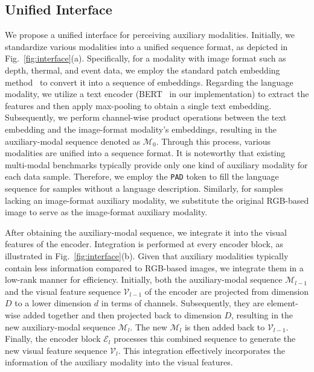 \subsection{Unified Interface}
\label{sec-interface}

We propose a unified interface for perceiving auxiliary modalities.
Initially, we standardize various modalities into a unified sequence format, as depicted in Fig.~\ref{fig:interface}(a). Specifically, for a modality with image format such as depth, thermal, and event data, we employ the standard patch embedding method~\cite{ViT} to convert it into a sequence of embeddings. Regarding the language modality, we utilize a text encoder (BERT~\cite{BERT} in our implementation) to extract the features and then apply max-pooling to obtain a single text embedding. Subsequently, we perform channel-wise product operations between the text embedding and the image-format modality's embeddings, resulting in the auxiliary-modal sequence denoted as $\mathcal{M}_0$. Through this process, various modalities are unified into a sequence format. It is noteworthy that existing multi-modal benchmarks typically provide only one kind of auxiliary modality for each data sample. Therefore, we employ the \texttt{PAD} token to fill the language sequence for samples without a language description. Similarly, for samples lacking an image-format auxiliary modality, we substitute the original RGB-based image to serve as the image-format auxiliary modality.

After obtaining the auxiliary-modal sequence, we integrate it into the visual features of the encoder. Integration is performed at every encoder block,  as illustrated in Fig.~\ref{fig:interface}(b).
Given that auxiliary modalities typically contain less information compared to RGB-based images, we integrate them in a low-rank manner for efficiency. Initially, both the auxiliary-modal sequence $\mathcal{M}_{l-1}$ and the visual feature sequence $\mathcal{V}_{l-1}$ of the encoder are projected from dimension $D$ to a lower dimension $d$ in terms of channels. Subsequently, they are element-wise added together and then projected back to dimension $D$, resulting in the new auxiliary-modal sequence $\mathcal{M}_{l}$. The new $\mathcal{M}_{l}$ is then added back to $\mathcal{V}_{l-1}$. Finally, the encoder block $\mathcal{E}_{l}$ processes this combined sequence to generate the new visual feature sequence $\mathcal{V}_{l}$. This integration effectively incorporates the information of the auxiliary modality into the visual features.

